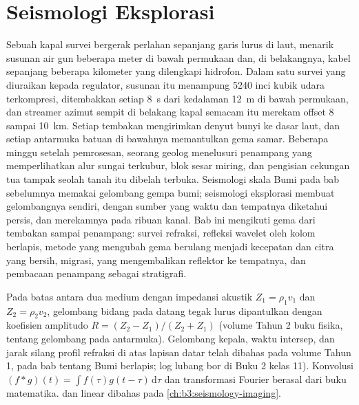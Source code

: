 \chapter{Seismologi Eksplorasi}\label{ch:b3:exploration-seismology}

Sebuah kapal survei bergerak perlahan sepanjang garis lurus di laut, menarik susunan
air gun beberapa meter di bawah permukaan dan, di belakangnya, kabel
sepanjang beberapa kilometer yang dilengkapi hidrofon. Dalam satu survei yang diuraikan kepada
regulator, susunan itu menampung \num{5240} inci kubik udara terkompresi, ditembakkan setiap
\qty{8}{s} dari kedalaman \qty{12}{m} di bawah permukaan, dan streamer azimut sempit
di belakang kapal semacam itu merekam offset 8 sampai \qty{10}{km}.
Setiap tembakan mengirimkan denyut bunyi ke dasar laut, dan setiap antarmuka batuan
di bawahnya memantulkan gema samar. Beberapa minggu setelah pemrosesan, seorang geolog menelusuri
penampang yang memperlihatkan alur sungai terkubur, blok sesar miring, dan
pengisian  cekungan tua tampak seolah tanah itu dibelah terbuka.
Seismologi skala Bumi pada bab sebelumnya memakai gelombang
gempa bumi; seismologi eksplorasi membuat gelombangnya sendiri, dengan sumber yang waktu dan
tempatnya diketahui persis, dan merekamnya pada ribuan kanal. Bab ini
mengikuti gema dari tembakan sampai penampang: survei refraksi,
refleksi wavelet oleh kolom berlapis, metode 
yang mengubah gema berulang menjadi kecepatan dan citra yang bersih, migrasi, yang
mengembalikan reflektor ke tempatnya, dan pembacaan penampang sebagai
stratigrafi.

\begin{recall}
Pada batas antara dua medium dengan impedansi akustik $Z_1 = \rho_1v_1$ dan
$Z_2 = \rho_2v_2$, gelombang bidang pada datang tegak lurus dipantulkan dengan
koefisien amplitudo $R = (Z_2 - Z_1)/(Z_2 + Z_1)$ (volume Tahun 2
buku fisika, tentang gelombang pada antarmuka). Gelombang kepala, waktu intersep, dan
jarak silang profil refraksi di atas lapisan datar telah dibahas pada
volume Tahun 1, pada bab tentang Bumi berlapis; log lubang bor di Buku 2
kelas 11). Konvolusi $(f*g)(t) = \int f(\tau)g(t - \tau)\,\mathrm d\tau$
dan transformasi Fourier berasal dari buku matematika.  dan
 linear dibahas pada \cref{ch:b3:seismology-imaging}.
\end{recall}

